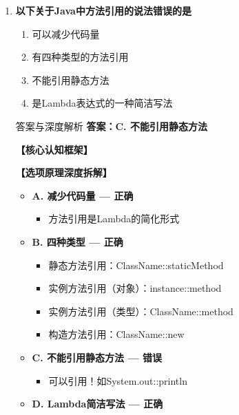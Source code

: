 \documentclass[12pt, a4paper]{ctexart}
\begin{document}
\begin{enumerate}[label=\textbf{\arabic*.}]
	      \vspace{1em}

	\item \textbf{以下关于Java中方法引用的说法错误的是}
	      \begin{enumerate}[label=\Alph*.]
		      \item 可以减少代码量
		      \item 有四种类型的方法引用
		      \item 不能引用静态方法
		      \item 是Lambda表达式的一种简洁写法
	      \end{enumerate}

	      \begin{bluebox}{答案与深度解析}
		      \textbf{答案：C. 不能引用静态方法}

		      \textbf{【核心认知框架】}

		      \textbf{【选项原理深度拆解】}
					  \begin{itemize}[label={}, leftmargin=*, nosep]

		      
		      \item \textbf{A. 减少代码量 — 正确}
					  \begin{itemize}[label={}, nosep]
		      
			      \item 方法引用是Lambda的简化形式
		      

					  \end{itemize}
		      \item \textbf{B. 四种类型 — 正确}
					  \begin{itemize}[label={}, nosep]
		      
			      \item 静态方法引用：ClassName::staticMethod
			      \item 实例方法引用（对象）：instance::method
			      \item 实例方法引用（类型）：ClassName::method
			      \item 构造方法引用：ClassName::new
		      

					  \end{itemize}
		      \item \textbf{C. 不能引用静态方法 — 错误}
					  \begin{itemize}[label={}, nosep]
		      
			      \item 可以引用！如System.out::println
		      

					  \end{itemize}
		      \item \textbf{D. Lambda简洁写法 — 正确}
					  \begin{itemize}[label={}, nosep]
		      

\end{itemize}
\end{itemize}
\end{bluebox}
\end{enumerate}
\end{document}
